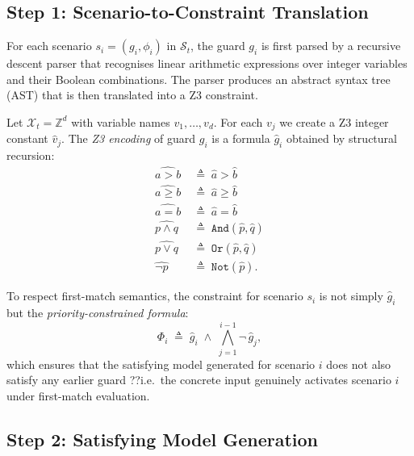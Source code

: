 \subsection{Step 1: Scenario-to-Constraint Translation}
\label{subsec:method:translate}

For each scenario $s_i = (g_i, \phi_i)$ in $\mathcal{S}_t$, the guard $g_i$
is first parsed by a recursive descent parser that recognises linear arithmetic
expressions over integer variables and their Boolean combinations.  The parser
produces an abstract syntax tree (AST) that is then translated into a Z3
constraint.

\begin{definition}
\label{def:z3-guard}
Let $\mathcal{X}_t = \mathbb{Z}^d$ with variable names $v_1,\ldots,v_d$.
For each $v_j$ we create a Z3 integer constant $\hat{v}_j$.  The
\emph{Z3 encoding} of guard $g_i$ is a formula $\hat{g}_i$ obtained by
structural recursion:
\begin{align*}
  \widehat{a > b}   &\;\triangleq\; \hat{a} > \hat{b} \\
  \widehat{a \ge b} &\;\triangleq\; \hat{a} \ge \hat{b} \\
  \widehat{a = b}   &\;\triangleq\; \hat{a} = \hat{b} \\
  \widehat{p \land q} &\;\triangleq\; \mathtt{And}(\hat{p}, \hat{q}) \\
  \widehat{p \lor q}  &\;\triangleq\; \mathtt{Or}(\hat{p}, \hat{q}) \\
  \widehat{\lnot p}   &\;\triangleq\; \mathtt{Not}(\hat{p}).
\end{align*}
\end{definition}

To respect first-match semantics, the constraint for scenario $s_i$ is not
simply $\hat{g}_i$ but the \emph{priority-constrained formula}:
\begin{equation}
  \Phi_i \;\triangleq\; \hat{g}_i \;\land\;
    \bigwedge_{j=1}^{i-1} \lnot\,\hat{g}_j,
  \label{eq:priority-constraint}
\end{equation}
which ensures that the satisfying model generated for scenario $i$ does not
also satisfy any earlier guard ??i.e.\ the concrete input genuinely activates
scenario $i$ under first-match evaluation.

\subsection{Step 2: Satisfying Model Generation}
\label{subsec:method:z3-solve}

